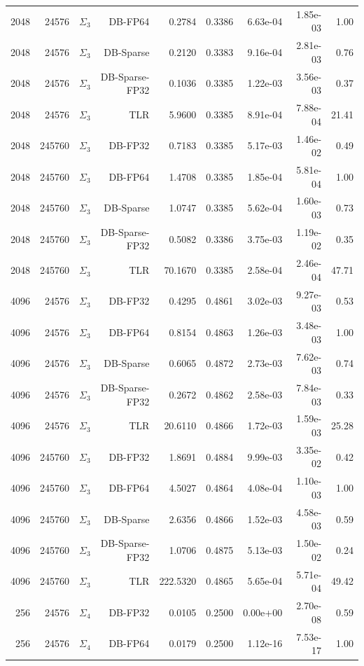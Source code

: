 \begin{tabular}{|r|r|r|r|r|r|r|r|r|}
  2048 & 24576 & $\Sigma_3$ & DB-FP64 & 0.2784 & 0.3386 & 6.63e-04 & 1.85e-03 & 1.00 \\
  2048 & 24576 & $\Sigma_3$ & DB-Sparse & 0.2120 & 0.3383 & 9.16e-04 & 2.81e-03 & 0.76 \\
  2048 & 24576 & $\Sigma_3$ & DB-Sparse-FP32 & 0.1036 & 0.3385 & 1.22e-03 & 3.56e-03 & 0.37 \\
  2048 & 24576 & $\Sigma_3$ & TLR & 5.9600 & 0.3385 & 8.91e-04 & 7.88e-04 & 21.41 \\
  2048 & 245760 & $\Sigma_3$ & DB-FP32 & 0.7183 & 0.3385 & 5.17e-03 & 1.46e-02 & 0.49 \\
  2048 & 245760 & $\Sigma_3$ & DB-FP64 & 1.4708 & 0.3385 & 1.85e-04 & 5.81e-04 & 1.00 \\
  2048 & 245760 & $\Sigma_3$ & DB-Sparse & 1.0747 & 0.3385 & 5.62e-04 & 1.60e-03 & 0.73 \\
  2048 & 245760 & $\Sigma_3$ & DB-Sparse-FP32 & 0.5082 & 0.3386 & 3.75e-03 & 1.19e-02 & 0.35 \\
  2048 & 245760 & $\Sigma_3$ & TLR & 70.1670 & 0.3385 & 2.58e-04 & 2.46e-04 & 47.71 \\
  4096 & 24576 & $\Sigma_3$ & DB-FP32 & 0.4295 & 0.4861 & 3.02e-03 & 9.27e-03 & 0.53 \\
  4096 & 24576 & $\Sigma_3$ & DB-FP64 & 0.8154 & 0.4863 & 1.26e-03 & 3.48e-03 & 1.00 \\
  4096 & 24576 & $\Sigma_3$ & DB-Sparse & 0.6065 & 0.4872 & 2.73e-03 & 7.62e-03 & 0.74 \\
  4096 & 24576 & $\Sigma_3$ & DB-Sparse-FP32 & 0.2672 & 0.4862 & 2.58e-03 & 7.84e-03 & 0.33 \\
  4096 & 24576 & $\Sigma_3$ & TLR & 20.6110 & 0.4866 & 1.72e-03 & 1.59e-03 & 25.28 \\
  4096 & 245760 & $\Sigma_3$ & DB-FP32 & 1.8691 & 0.4884 & 9.99e-03 & 3.35e-02 & 0.42 \\
  4096 & 245760 & $\Sigma_3$ & DB-FP64 & 4.5027 & 0.4864 & 4.08e-04 & 1.10e-03 & 1.00 \\
  4096 & 245760 & $\Sigma_3$ & DB-Sparse & 2.6356 & 0.4866 & 1.52e-03 & 4.58e-03 & 0.59 \\
  4096 & 245760 & $\Sigma_3$ & DB-Sparse-FP32 & 1.0706 & 0.4875 & 5.13e-03 & 1.50e-02 & 0.24 \\
  4096 & 245760 & $\Sigma_3$ & TLR & 222.5320 & 0.4865 & 5.65e-04 & 5.71e-04 & 49.42 \\
  256 & 24576 & $\Sigma_4$ & DB-FP32 & 0.0105 & 0.2500 & 0.00e+00 & 2.70e-08 & 0.59 \\
  256 & 24576 & $\Sigma_4$ & DB-FP64 & 0.0179 & 0.2500 & 1.12e-16 & 7.53e-17 & 1.00 \\

\end{tabular}
